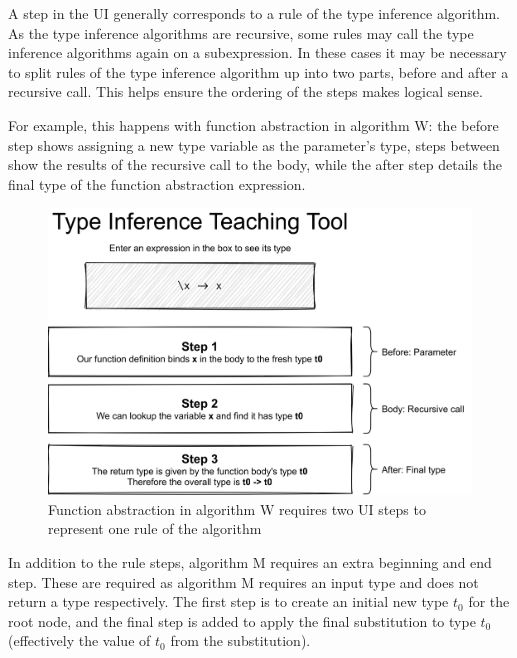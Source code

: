 \documentclass[a4paper,fleqn,oneside,12pt]{report}
\begin{document}
A step in the UI generally corresponds to a rule of the type inference algorithm. As the type inference algorithms are recursive, some rules may call the type inference algorithms again on a subexpression. In these cases it may be necessary to split rules of the type inference algorithm up into two parts, before and after a recursive call. This helps ensure the ordering of the steps makes logical sense.

For example, this happens with function abstraction in algorithm W: the before step shows assigning a new type variable as the parameter’s type, steps between show the results of the recursive call to the body, while the after step details the final type of the function abstraction expression.

{\centering \begin{figure}[h!]
  \centering
  \includegraphics[width=0.945\linewidth]{images/image15.png}
  \caption{Function abstraction in algorithm W requires two UI steps to represent one rule of the algorithm}
\end{figure} \par}

In addition to the rule steps, algorithm M requires an extra beginning and end step. These are required as algorithm M requires an input type and does not return a type respectively. The first step is to create an initial new type $t_0$ for the root node, and the final step is added to apply the final substitution to type $t_0$ (effectively the value of $t_0$ from the substitution).
\end{document}
